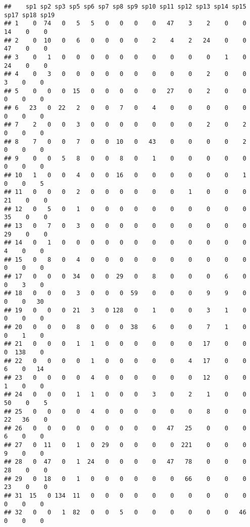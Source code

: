 \documentclass[
]{book}
\begin{document}
\begin{verbatim}
##    sp1 sp2 sp3 sp5 sp6 sp7 sp8 sp9 sp10 sp11 sp12 sp13 sp14 sp15 sp17 sp18 sp19
## 1    0  74   0   5   5   0   0   0    0   47    3    2    0    0   14    0    0
## 2    0  10   0   6   0   0   0   0    2    4    2   24    0    0   47    0    0
## 3    0   1   0   0   0   0   0   0    0    0    0    0    1    0   24    0    0
## 4    0   3   0   0   0   0   0   0    0    0    0    2    0    0    3    0    0
## 5    0   0   0  15   0   0   0   0    0   27    0    2    0    0    0    0    0
## 6   23   0  22   2   0   0   7   0    4    0    0    0    0    0    0    0    0
## 7    2   0   0   3   0   0   0   0    0    0    0    2    0    2    0    0    0
## 8    7   0   0   7   0   0  10   0   43    0    0    0    0    2    0    0    0
## 9    0   0   5   8   0   0   8   0    1    0    0    0    0    0    0    0    0
## 10   1   0   0   4   0   0  16   0    0    0    0    0    0    1    0    0    5
## 11   0   0   0   2   0   0   0   0    0    0    1    0    0    0   21    0    0
## 12   0   5   0   1   0   0   0   0    0    0    0    0    0    0   35    0    0
## 13   0   7   0   3   0   0   0   0    0    0    0    0    0    0   29    0    0
## 14   0   1   0   0   0   0   0   0    0    0    0    0    0    0    4    0    0
## 15   0   8   0   4   0   0   0   0    0    0    0    0    0    0    0    0    0
## 17   0   0   0  34   0   0  29   0    8    0    0    0    6    0    0    3    0
## 18   0   0   0   3   0   0   0  59    0    0    0    9    9    0    0    0   30
## 19   0   0   0  21   3   0 128   0    1    0    0    3    1    0    0    0    0
## 20   0   0   0   8   0   0   0  38    6    0    0    7    1    0    0    1    0
## 21   0   0   0   1   1   0   0   0    0    0    0   17    0    0    0  138    0
## 22   0   0   0   0   1   0   0   0    0    0    4   17    0    0    6    0   14
## 23   0   0   0   0   4   0   0   0    0    0    0   12    0    0    1    0    0
## 24   0   0   0   1   1   0   0   0    3    0    2    1    0    0   50    0    5
## 25   0   0   0   0   4   0   0   0    0    0    0    8    0    0   22   36    0
## 26   0   0   0   0   0   0   0   0    0   47   25    0    0    0    6    0    0
## 27   0  11   0   1   0  29   0   0    0    0  221    0    0    0    9    0    0
## 28   0  47   0   1  24   0   0   0    0   47   78    0    0    0   28    0    0
## 29   0  18   0   1   0   0   0   0    0    0   66    0    0    0   23    0    0
## 31  15   0 134  11   0   0   0   0    0    0    0    0    0    0    0    0    0
## 32   0   0   1  82   0   0   5   0    0    0    0    0    0   46    0    0    0

\end{verbatim}
\end{document}
